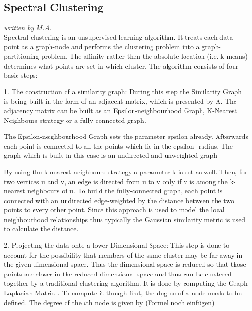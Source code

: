 \subsection{Spectral Clustering}
\textit{written by M.A.}\\

Spectral clustering is an unsupervised learning algorithm. It treats each data point as a graph-node and performs the clustering problem into a graph-partitioning problem. The affinity rather then the absolute location (i.e. k-means) determines what points are set in which cluster.
The algorithm consists of four basic steps: \newline

1.	The construction of a similarity graph:\newline
During this step the Similarity Graph is being built in the form of an adjacent matrix, which is presented by A. The adjacency matrix can be built as an Epsilon-neighbourhood Graph, K-Nearest Neighbours strategy or a fully-connected graph. \newline

The Epsilon-neighbourhood Graph sets the parameter epsilon already. Afterwards each point is connected to all the points which lie in the epsilon -radius. The graph which is built in this case is an undirected and unweighted graph. \newline

By using the k-nearest neighbours strategy a parameter k is set as well. Then, for two vertices u and v, an edge is directed from u to v only if v is among the k-nearest neighbours of u. 
To build the fully-connected graph, each point is connected with an undirected edge-weighted by the distance between the two points to every other point. Since this approach is used to model the local neighbourhood relationships thus typically the Gaussian similarity metric is used to calculate the distance. \newline

2.	Projecting the data onto a lower Dimensional Space: This step is done to account for the possibility that members of the same cluster may be far away in the given dimensional space. Thus the dimensional space is reduced so that those points are closer in the reduced dimensional space and thus can be clustered together by a traditional clustering algorithm. It is done by computing the Graph Laplacian Matrix . To compute it though first, the degree of a node needs to be defined. The degree of the $i$th node is given by (Formel noch einfügen) \newline

